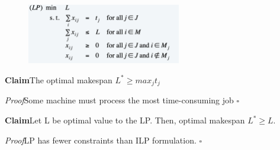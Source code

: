 \documentclass[11pt]{article}
\newenvironment{claim}[1]{\par\textbf{Claim}\space#1}{}
\newenvironment{proof}[1]{\par\textit{Proof}\space#1}{\hfill\ensuremath{\square}}
\begin{document}
\begin{figure}[H]
		\centering
		\includegraphics[width=0.6\textwidth ]{gLP}
\end{figure}

\begin{claim}
The optimal makespan $L^{*} ≥ max_{j} t_{j}$
\end{claim}
\begin{proof}
Some machine must process the most time-consuming job
\end{proof}\\
\begin{claim}
Let L be optimal value to the LP. Then, optimal makespan $L^{*} \geq L$.
\end{claim}\\
\begin{proof}
LP has fewer constraints than ILP formulation.
\end{proof}
\end{document}
